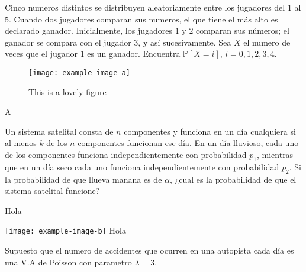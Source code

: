 \documentclass[12pt,answers,addpoints,a4paper]{exam}%
\begin{document}
\begin{questions}

	\question%
	Cinco numeros distintos se distribuyen aleatoriamente entre los jugadores del $1$ al $5$. Cuando dos jugadores comparan sus numeros, el que tiene el más alto es declarado ganador. Inicialmente, los jugadores $1$ y $2$ comparan sus  
	números; el ganador se compara con el jugador $3$, y así sucesivamente. Sea $X$ el numero de veces que el jugador $1$ es un ganador. Encuentra $\mathds{P}[X = i]$, $i = 0, 1, 2, 3, 4$.
	
	\ifprintanswers
	\begin{figure}[!ht]
		\centering
		\texttt{[image: example-image-a]}
		\caption{This is a lovely figure}
		\label{fig:lovely}
	\end{figure}
	\fi
	\begin{solutionorbox}
		A
	\end{solutionorbox}
	
	\question%
	Un sistema satelital consta de $n$ componentes y funciona en un día cualquiera si al menos $k$ de los $n$ componentes	funcionan ese día. En un día lluvioso, cada uno de los componentes funciona independientemente con probabilidad $p_1$, mientras que en un día seco cada uno funciona independientemente con probabilidad $p_2$. Si la probabilidad de
	que llueva manana es de $\alpha$, ¿cual es la probabilidad de que el sistema satelital funcione?
	\begin{solutionorlines}
	Hola
	
	\texttt{[image: example-image-b]}
	\centering
	\label{fig:lovely}
	\justifying
	Hola
	\end{solutionorlines}
	\question%
	Supuesto que el numero de accidentes que ocurren en una autopista cada día es una V.A de Poisson con parametro $\lambda=3$.
	
\end{questions}
\end{document}
